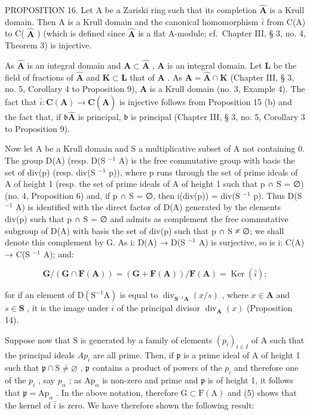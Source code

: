 PROPOSITION 16. Let A be a Zariski ring such that its completion \(\hat{\mathbf{A}}\) is a Krull domain. Then A is a Krull domain and the canonical homomorphism \(\bar{i}\) from C(A) to C( \(\hat{\mathbf{A}}\) ) (which is defined since \(\hat{\mathbf{A}}\) is a flat A-module; cf.~Chapter III, § 3, no. 4, Theorem 3) is injective.

As \(\hat{\mathbf{A}}\) is an integral domain and \(\mathbf{A} \subset \hat{\mathbf{A}}\) , \(\mathbf{A}\) is an integral domain. Let \(\mathbf{L}\) be the field of fractions of \(\hat{\mathbf{A}}\) and \(\mathbf{K} \subset \mathbf{L}\) that of \(\mathbf{A}\) . As \(\mathbf{A} = \hat{\mathbf{A}} \cap \mathbf{K}\) (Chapter III, § 3, no. 5, Corollary 4 to Proposition 9), \(\mathbf{A}\) is a Krull domain (no. 3, Example 4). The fact that \(\bar{i}: \mathbf{C}(\mathbf{A}) \to \mathbf{C}(\hat{\mathbf{A}})\) is injective follows from Proposition 15 (b) and the fact that, if \(\mathfrak{b}\hat{\mathbf{A}}\) is principal, \(\mathfrak{b}\) is principal (Chapter III, § 3, no. 5, Corollary 3 to Proposition 9).

Now let A be a Krull domain and S a multiplicative subset of A not containing 0. The group D(A) (resp. D(S \(^{-1}\) A) is the free commutative group with basis the set of div(p) (resp. div(S \(^{-1}\) p)), where p runs through the set of prime ideals of A of height 1 (resp. the set of prime ideals of A of height 1 such that p ∩ S = ∅) (no. 4, Proposition 6) and, if p ∩ S = ∅, then i(div(p)) = div(S \(^{-1}\) p). Thus D(S \(^{-1}\) A) is identified with the direct factor of D(A) generated by the elements div(p) such that p ∩ S = ∅ and admits as complement the free commutative subgroup of D(A) with basis the set of div(p) such that p ∩ S ≠ ∅; we shall denote this complement by G. As i: D(A) → D(S \(^{-1}\) A) is surjective, so is i: C(A) → C(S \(^{-1}\) A); and:

\[
\mathbf {G} / (\mathbf {G} \cap \mathbf {F} (\mathbf {A})) = (\mathbf {G} + \mathbf {F} (\mathbf {A})) / \mathbf {F} (\mathbf {A}) = \operatorname{Ker} (\bar {i});\tag{5}
\]

for if an element of \(\mathrm{D}(\mathrm{S}^{-1}\mathrm{A})\) is equal to \(\operatorname{div}_{\mathbf{S}^{-1}\mathbf{A}}(x / s)\) , where \(x \in \mathbf{A}\) and \(s \in \mathbf{S}\) , it is the image under \(i\) of the principal divisor \(\operatorname{div}_{\mathbf{A}}(x)\) (Proposition 14).

Suppose now that S is generated by a family of elements \((p_{i})_{i\in I}\) of A such that the principal ideals \(Ap_{i}\) are all prime. Then, if \(\mathfrak{p}\) is a prime ideal of A of height 1 such that \(\mathfrak{p} \cap \mathrm{S} \neq \varnothing\) , \(\mathfrak{p}\) contains a product of powers of the \(p_{i}\) and therefore one of the \(p_{i}\) , say \(p_{\alpha}\) ; as \(\mathrm{Ap}_{\alpha}\) is non-zero and prime and \(\mathfrak{p}\) is of height 1, it follows that \(\mathfrak{p} = \mathrm{Ap}_{\alpha}\) . In the above notation, therefore \(\mathrm{G} \subset \mathrm{F}(\mathrm{A})\) and (5) shows that the kernel of \(\bar{i}\) is zero. We have therefore shown the following result:

